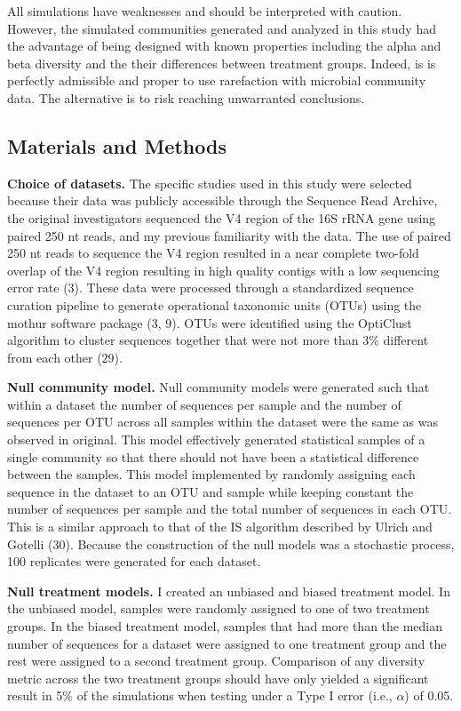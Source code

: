 \documentclass[
]{article}
\begin{document}
All simulations have weaknesses and should be interpreted with caution.
However, the simulated communities generated and analyzed in this study
had the advantage of being designed with known properties including the
alpha and beta diversity and the their differences between treatment
groups. Indeed, is is perfectly admissible and proper to use rarefaction
with microbial community data. The alternative is to risk reaching
unwarranted conclusions.

\hypertarget{materials-and-methods}{%
\subsection{Materials and Methods}\label{materials-and-methods}}

\textbf{Choice of datasets.} The specific studies used in this study
were selected because their data was publicly accessible through the
Sequence Read Archive, the original investigators sequenced the V4
region of the 16S rRNA gene using paired 250 nt reads, and my previous
familiarity with the data. The use of paired 250 nt reads to sequence
the V4 region resulted in a near complete two-fold overlap of the V4
region resulting in high quality contigs with a low sequencing error
rate (3). These data were processed through a standardized sequence
curation pipeline to generate operational taxonomic units (OTUs) using
the mothur software package (3, 9). OTUs were identified using the
OptiClust algorithm to cluster sequences together that were not more
than 3\% different from each other (29).

\textbf{Null community model.} Null community models were generated such
that within a dataset the number of sequences per sample and the number
of sequences per OTU across all samples within the dataset were the same
as was observed in original. This model effectively generated
statistical samples of a single community so that there should not have
been a statistical difference between the samples. This model
implemented by randomly assigning each sequence in the dataset to an OTU
and sample while keeping constant the number of sequences per sample and
the total number of sequences in each OTU. This is a similar approach to
that of the IS algorithm described by Ulrich and Gotelli (30). Because
the construction of the null models was a stochastic process, 100
replicates were generated for each dataset.

\textbf{Null treatment models.} I created an unbiased and biased
treatment model. In the unbiased model, samples were randomly assigned
to one of two treatment groups. In the biased treatment model, samples
that had more than the median number of sequences for a dataset were
assigned to one treatment group and the rest were assigned to a second
treatment group. Comparison of any diversity metric across the two
treatment groups should have only yielded a significant result in 5\% of
the simulations when testing under a Type I error (i.e., \(\alpha\)) of
0.05.
\end{document}
